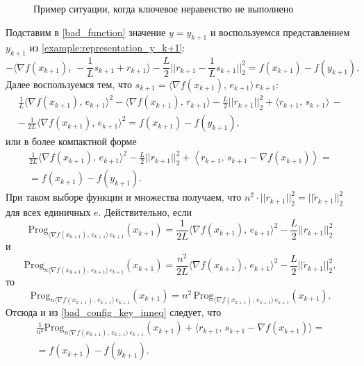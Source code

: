 \documentclass[11pt]{article}
\def\Prog{\text{Prog}}
\begin{document}
		\begin{figure}[htb]
			\caption{Пример ситуации, когда ключевое неравенство не выполнено}
			\label{ris:bad_set}
		\end{figure}
		Подставим в \eqref{bad_function} значение $y=y_{k+1}$ и воспользуемся представлением $y_{k+1}$ из \eqref{example:representation_y_k+1}:
		$$
		-\langle \nabla f(x_{k+1}), \, -\frac{1}{L}s_{k+1} + r_{k+1} \rangle - \frac{L}{2}\Big|\Big|r_{k+1}-\frac{1}{L}s_{k+1}\Big|\Big|_2^2 = f(x_{k+1}) - f(y_{k+1}).
		$$
		Далее воспользуемся тем, что $s_{k+1} = \langle\nabla f(x_{k+1}), \, e_{k+1}\rangle \, e_{k+1}$:
		\begin{equation*}
		\begin{array}{rl}
		\frac{1}{L}\langle\nabla f(x_{k+1}), \, e_{k+1}\rangle^2 - \langle\nabla f(x_{k+1}), \, r_{k+1}\rangle - \frac{L}{2}\Big|\Big|r_{k+1}\Big|\Big|_2^2 + \langle r_{k+1}, \, s_{k+1}\rangle \, -\\
		- \, \frac{1}{2L}\langle\nabla f(x_{k+1}) , \, e_{k+1}\rangle^2 = f(x_{k+1}) - f(y_{k+1}),
		\end{array}
		\end{equation*}
		или в более компактной форме
		\begin{equation}\label{bad_config_key_inneq}
		\begin{array}{rl}
		\frac{1}{2L}\langle\nabla f(x_{k+1}), \, e_{k+1}\rangle^2 - \frac{L}{2}\Big|\Big|r_{k+1}\Big|\Big|_2^2 + \left \langle r_{k+1}, \,  s_{k+1} - \nabla f(x_{k+1}) \right \rangle=\\ = f(x_{k+1}) - f(y_{k+1}).
		\end{array}
		\end{equation}
		При таком выборе функции и множества получаем, что $n^2\cdot||r_{k+1}||_2^2 = ||\tilde{r}_{k+1}||_2^2$ для всех единичных $e$. Действительно, если
		$$
		\Prog_{\langle\nabla f(x_{k+1}), \, e_{k+1}\rangle \, e_{k+1}}(x_{k+1}) = \frac{1}{2L}\langle\nabla f(x_{k+1}) , \, e_{k+1}\rangle^2 - \frac{L}{2}\Big|\Big|r_{k+1}\Big|\Big|_2^2
		$$
		и
		$$
		\Prog_{n\langle\nabla f(x_{k+1}), \, e_{k+1}\rangle \, e_{k+1}}(x_{k+1}) = \frac{n^2}{2L}\langle\nabla f(x_{k+1}) , \, e_{k+1}\rangle^2 - \frac{L}{2}\Big|\Big|\tilde{r}_{k+1}\Big|\Big|_2^2,
		$$
		то
		$$
		\Prog_{n\langle\nabla f(x_{k+1}), \, e_{k+1}\rangle \, e_{k+1}}(x_{k+1}) = n^2 \, \Prog_{\langle\nabla f(x_{k+1}), \, e_{k+1}\rangle \, e_{k+1}}(x_{k+1}).
		$$
		Отсюда и из \eqref{bad_config_key_inneq} следует, что
		\begin{equation*}
		\begin{array}{rl}
		\frac{1}{n^2}\Prog_{n\langle\nabla f(x_{k+1}), \, e_{k+1}\rangle \,  e_{k+1}}(x_{k+1}) + \langle r_{k+1}, \, s_{k+1} - \nabla f(x_{k+1})\rangle=\\ = f(x_{k+1}) - f(y_{k+1}).
		\end{array}
		\end{equation*}
\end{document}

